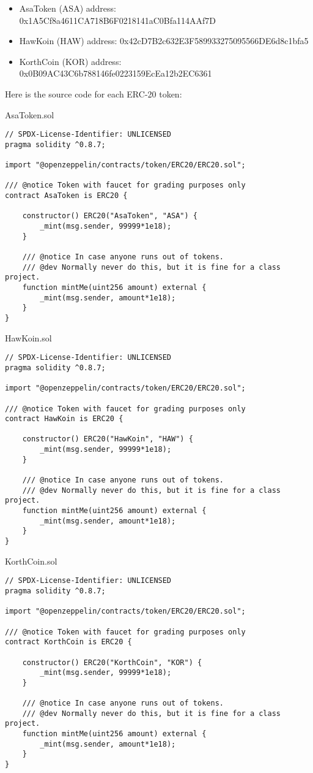 \documentclass[10pt]{article}
\begin{document}
\begin{itemize}
    \item AsaToken (ASA) address:  0x1A5Cf8a4611CA718B6F0218141aC0Bfa114AAf7D
    \item HawKoin (HAW) address:  0x42cD7B2c632E3F589933275095566DE6d8c1bfa5
    \item KorthCoin (KOR) address: 0x0B09AC43C6b788146fe0223159EcEa12b2EC6361
\end{itemize}

Here is the source code for each ERC-20 token:

AsaToken.sol
\begin{verbatim}
// SPDX-License-Identifier: UNLICENSED
pragma solidity ^0.8.7;

import "@openzeppelin/contracts/token/ERC20/ERC20.sol";

/// @notice Token with faucet for grading purposes only
contract AsaToken is ERC20 {

    constructor() ERC20("AsaToken", "ASA") {
        _mint(msg.sender, 99999*1e18);
    }

    /// @notice In case anyone runs out of tokens.
    /// @dev Normally never do this, but it is fine for a class project.
    function mintMe(uint256 amount) external {
        _mint(msg.sender, amount*1e18);
    }
}
\end{verbatim}

HawKoin.sol
\begin{verbatim}
// SPDX-License-Identifier: UNLICENSED
pragma solidity ^0.8.7;

import "@openzeppelin/contracts/token/ERC20/ERC20.sol";

/// @notice Token with faucet for grading purposes only
contract HawKoin is ERC20 {

    constructor() ERC20("HawKoin", "HAW") {
        _mint(msg.sender, 99999*1e18);
    }

    /// @notice In case anyone runs out of tokens.
    /// @dev Normally never do this, but it is fine for a class project.
    function mintMe(uint256 amount) external {
        _mint(msg.sender, amount*1e18);
    }
}
\end{verbatim}

KorthCoin.sol
\begin{verbatim}
// SPDX-License-Identifier: UNLICENSED
pragma solidity ^0.8.7;

import "@openzeppelin/contracts/token/ERC20/ERC20.sol";

/// @notice Token with faucet for grading purposes only
contract KorthCoin is ERC20 {

    constructor() ERC20("KorthCoin", "KOR") {
        _mint(msg.sender, 99999*1e18);
    }

    /// @notice In case anyone runs out of tokens.
    /// @dev Normally never do this, but it is fine for a class project.
    function mintMe(uint256 amount) external {
        _mint(msg.sender, amount*1e18);
    }
}
\end{verbatim}
\end{document}
